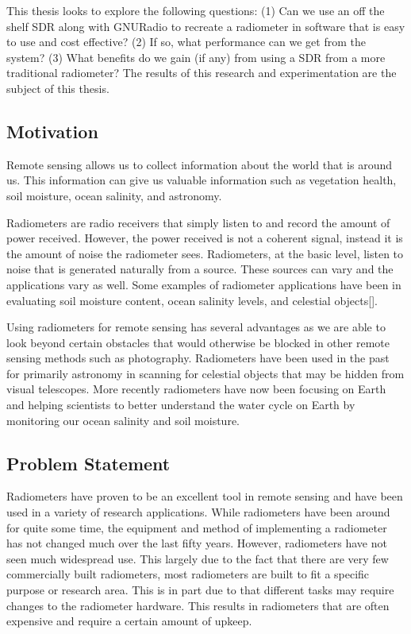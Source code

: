 This thesis looks to explore the following questions: (1) Can we use an off the shelf SDR along with GNURadio to recreate a radiometer in software that is easy to use and cost effective?  (2) If so, what performance can we get from the system?  (3) What benefits do we gain (if any) from using a SDR from a more traditional radiometer? The results of this research and experimentation are the subject of this thesis.

\subsection{Motivation}
Remote sensing allows us to collect information about the world that is around us.  This information can give us valuable information such as vegetation health, soil moisture, ocean salinity, and astronomy.  

Radiometers are radio receivers that simply listen to and record the amount of power received.  However, the power received is not a coherent signal, instead it is the amount of noise the radiometer sees.  Radiometers, at the basic level, listen to noise that is generated naturally from a source.  These sources can vary and the applications vary as well.  Some examples of radiometer applications have been in evaluating soil moisture content, ocean salinity levels, and celestial objects[\cite{ulaby2014}].

Using radiometers for remote sensing has several advantages as we are able to look beyond certain obstacles that would otherwise be blocked in other remote sensing methods such as photography.  Radiometers have been used in the past for primarily astronomy in scanning for celestial objects that may be hidden from visual telescopes.  More recently radiometers have now been focusing on Earth and helping scientists to better understand the water cycle on Earth by monitoring our ocean salinity and soil moisture.  

\subsection{Problem Statement}
Radiometers have proven to be an excellent tool in remote sensing and have been used in a variety of research applications.  While radiometers have been around for quite some time, the equipment and method of implementing a radiometer has not changed much over the last fifty years.  However, radiometers have not seen much widespread use.  This largely due to the fact that there are very few commercially built radiometers, most radiometers are built to fit a specific purpose or research area.  This is in part due to that different tasks may require changes to the radiometer hardware.  This results in radiometers that are often expensive and require a certain amount of upkeep.  

